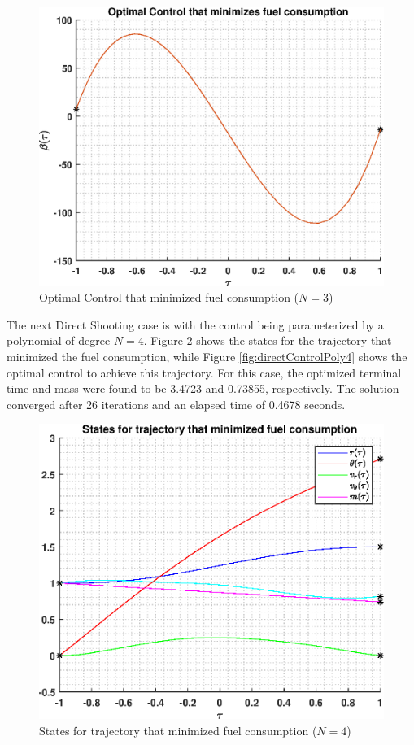 \documentclass[]{article}
\begin{document}
\begin{figure}
	\centering
	\includegraphics[scale=0.75]{directControlPoly3.eps}
	\caption{Optimal Control that minimized fuel consumption (\(N = 3\))}
	\label{fig:directControlPoly3}
\end{figure}
\vspace{2mm}\newline 
The next Direct Shooting case is with the control being parameterized by a polynomial of degree \(N = 4\). Figure \ref{fig:directStatesPoly4} shows the states for the trajectory that minimized the fuel consumption, while Figure \ref{fig:directControlPoly4} shows the optimal control to achieve this trajectory. For this case, the optimized terminal time and mass were found to be 3.4723 and 0.73855, respectively. The solution converged after 26 iterations and an elapsed time of 0.4678 seconds.
\begin{figure}
	\centering
	\includegraphics[scale=0.75]{directStatesPoly4.eps}
	\caption{States for trajectory that minimized fuel consumption (\(N = 4\))}
	\label{fig:directStatesPoly4}
\end{figure}
\end{document}
